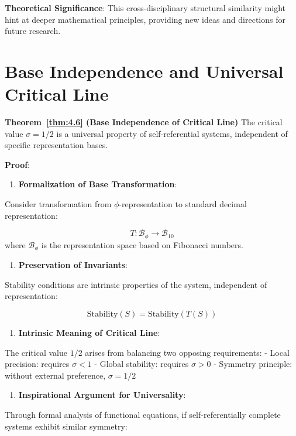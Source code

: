 \textbf{Theoretical Significance}:
This cross-disciplinary structural similarity might hint at deeper mathematical principles, providing new ideas and directions for future research.

\section{Base Independence and Universal Critical Line}
\label{sec:ch06_riemann:base-independence-and-universal-critical-line}

\textbf{Theorem~\ref{thm:4.6} (Base Independence of Critical Line)}
\label{thm:4.6}
The critical value $\sigma = 1/2$ is a universal property of self-referential systems, independent of specific representation bases.

\textbf{Proof}:

\begin{enumerate}
\item \textbf{Formalization of Base Transformation}:
\end{enumerate}
   Consider transformation from $\phi$-representation to standard decimal representation:
   
\begin{equation}
T: \mathcal{B}_\phi \to \mathcal{B}_{10}
\end{equation}
   where $\mathcal{B}_\phi$ is the representation space based on Fibonacci numbers.
   
\begin{enumerate}
\item \textbf{Preservation of Invariants}:
\end{enumerate}
   Stability conditions are intrinsic properties of the system, independent of representation:
   
\begin{equation}
\text{Stability}(S) = \text{Stability}(T(S))
\end{equation}

\begin{enumerate}
\item \textbf{Intrinsic Meaning of Critical Line}:
\end{enumerate}
   The critical value $1/2$ arises from balancing two opposing requirements:
   - Local precision: requires $\sigma < 1$
   - Global stability: requires $\sigma > 0$
   - Symmetry principle: without external preference, $\sigma = 1/2$
   
\begin{enumerate}
\item \textbf{Inspirational Argument for Universality}:
\end{enumerate}
   Through formal analysis of functional equations, if self-referentially complete systems exhibit similar symmetry:
   
